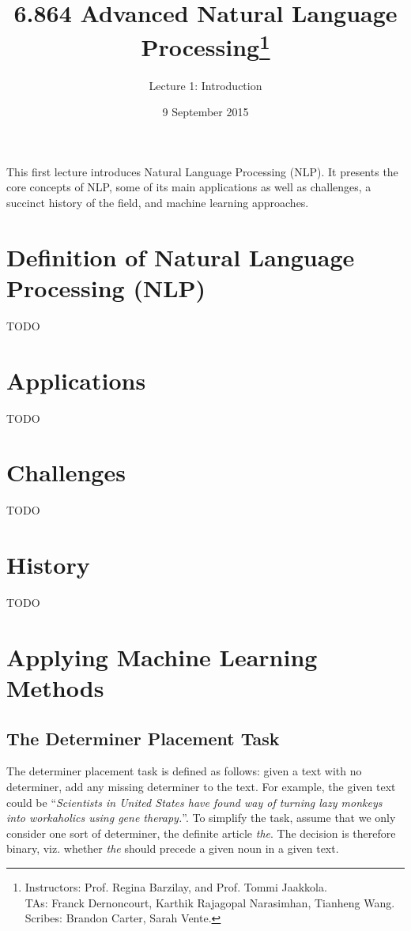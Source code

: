 \documentclass[justified, marginals=justified]{tufte-handout}
\title{6.864 Advanced Natural Language Processing\thanks{Instructors: Prof. Regina Barzilay, and Prof. Tommi Jaakkola.\\ TAs: Franck Dernoncourt, Karthik Rajagopal Narasimhan, Tianheng Wang. \\ Scribes: Brandon Carter, Sarah Vente.}}
\author[Lecture 1: Introduction]{Lecture 1: Introduction}
\date{9 September 2015} %
\begin{document}
\maketitle%

This first lecture introduces Natural Language Processing (NLP). It presents the core concepts of NLP, some of its main applications as well as challenges, a succinct history of the field, and machine learning approaches.

\section{Definition of Natural Language Processing (NLP)}\label{sec:what-is-nlp}

TODO


\section{Applications}\label{sec:nlp-applications}
TODO 


\section{Challenges}\label{sec:nlp-challenges}
TODO


\section{History}\label{sec:nlp-history}

TODO

\section{Applying Machine Learning Methods}\label{sec:applying-machine-learning-methods}

\subsection{The Determiner Placement Task}\label{sec:determiner-placement-task}

The determiner placement task is defined as follows: given a text with no determiner, add any missing determiner to the text. For example, the given text could be ``\textit{Scientists in United States have found way of turning lazy monkeys into workaholics using gene therapy.}''. To simplify the task, assume that we only consider one sort of determiner, the definite article \textit{the}. The decision is therefore binary, viz. whether \textit{the} should precede a given noun in a given text.
\end{document}
